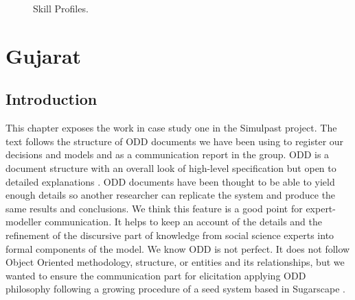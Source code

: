 \documentclass[11pt,oneside,a4paper,openright]{report}
\begin{document}
\begin{figure}[h!]
\centering
\setlength\fboxsep{0pt}
\setlength\fboxrule{0.5pt}
\caption{Skill Profiles.}
\label{fig:SkillProfiles}
\end{figure}


\chapter{Gujarat}
\label{sec:GujaratChapter}
\section{Introduction}

This chapter exposes the work in case study one in the Simulpast project. 
The text follows the structure of ODD documents we have been using to register our decisions and models and as a communication report in the group. ODD is a document structure with an overall look of high-level specification but open to detailed explanations \cite{GrimmBergerODD2012}. ODD documents have been thought to be able to yield enough details so another researcher can replicate the system and produce the same results and conclusions. We think this feature is a good point for expert-modeller communication. It helps to keep an account of the details and the refinement of the discursive part of knowledge from social science experts into formal components of the model. We know ODD is not perfect. It does not follow Object Oriented methodology, structure, or entities and its relationships, but we wanted to ensure the communication part for elicitation applying ODD philosophy following a growing procedure of a seed system based in Sugarscape \cite{EpsteinAxtell}.
\end{document}
